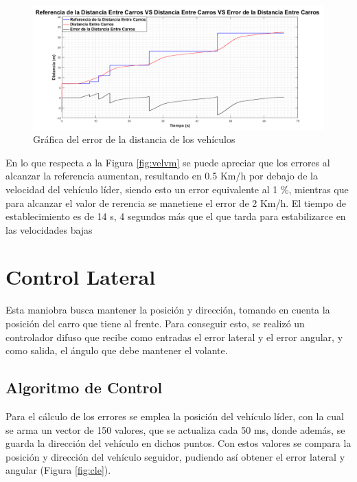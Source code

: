 \begin{figure}[H]
	\centering
		\includegraphics[scale=0.35]{Imagenes/accvbdist}
		\caption{Gráfica del error de la distancia de los vehículos}
		\label{fig:distvm}
\end{figure}	

\par En lo que respecta a la Figura \ref{fig:velvm} se puede apreciar que los errores al alcanzar la referencia aumentan, resultando en 0.5 Km/h por debajo de la velocidad del vehículo líder, siendo esto un error equivalente al 1 \%, mientras que para alcanzar el valor de rerencia se manetiene el error de 2 Km/h. El tiempo de establecimiento es de 14 s, 4 segundos más que el que tarda para estabilizarce en las velocidades bajas 


\section{Control Lateral}
Esta maniobra busca mantener la posición y dirección, tomando en cuenta la posición del carro que tiene al frente. Para conseguir esto, se realizó un controlador difuso\cite{sriranjanlateral} que recibe como entradas el error lateral y el error angular, y como salida, el ángulo que debe mantener el volante.  

\subsection{Algoritmo de Control}

Para el cálculo de los errores se emplea la posición del vehículo líder, con la cual se arma un vector de 150 valores, que se actualiza cada 50 ms, donde además, se guarda la dirección del vehículo en dichos puntos. Con estos valores se compara la posición y dirección del vehículo seguidor, pudiendo así obtener el error lateral y angular (Figura \ref{fig:cle}). 


